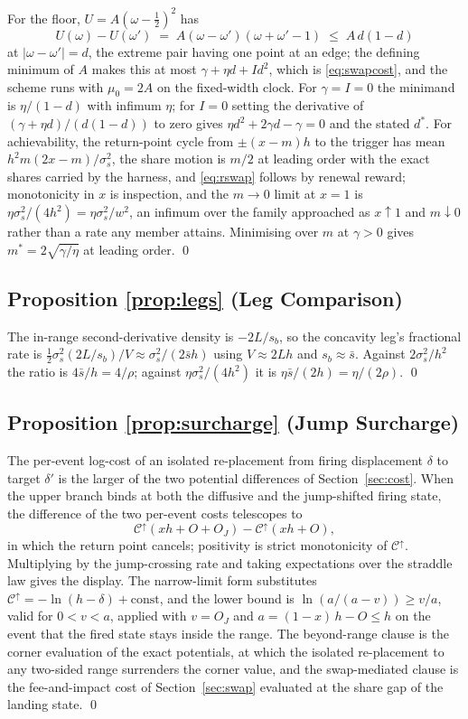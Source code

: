 \documentclass[11pt,a4paper]{article}
\theoremstyle{definition}
\theoremstyle{plain}
\theoremstyle{remark}
\begin{document}
For the floor, $U = A(\omega - \tfrac12)^2$ has
\[
U(\omega) - U(\omega') \;=\; A(\omega - \omega')(\omega + \omega' - 1)
\;\le\; A\,d(1 - d)
\]
at $|\omega - \omega'| = d$, the extreme pair having one point at an edge; the defining minimum of $A$ makes this at most $\gamma + \eta d + I d^2$, which is \eqref{eq:swapcost}, and the
scheme runs with $\mu_0 = 2A$ on the fixed-width clock. For $\gamma= I = 0$ the minimand is $\eta/(1 - d)$ with infimum
$\eta$; for $I = 0$ setting the derivative of $(\gamma +\eta d)/(d(1-d))$ to zero gives $\eta d^2 + 2\gamma d - \gamma = 0$
and the stated $d^*$. For achievability, the return-point cycle from
$\pm(x - m)h$ to the trigger has mean $h^2 m (2x - m)/\sigma_s^2$, the share motion is $m/2$ at leading order with the exact shares
carried by the harness, and \eqref{eq:rswap} follows by renewal reward; monotonicity in $x$ is inspection, and the $m \to 0$ limit at $x = 1$ is $\eta \sigma_s^2/(4h^2) = \eta\sigma_s^2/w^2$, an
infimum over the family approached as $x \uparrow 1$ and $m\downarrow 0$ rather than a rate any member attains. Minimising over $m$ at $\gamma > 0$ gives $m^* = 2\sqrt{\gamma/\eta}$ at leading 
order. \qed

\subsection{Proposition \ref{prop:legs} (Leg Comparison)}

The in-range second-derivative density is $-2L/s_b$, so the concavity leg's fractional rate is $\tfrac12 \sigma_s^2 (2L/s_b)/V
\approx \sigma_s^2/(2\bar s h)$ using $V \approx 2Lh$ and $s_b
\approx \bar s$. Against $2\sigma_s^2/h^2$ the ratio is $4\bar s/h
= 4/\rho$; against $\eta\sigma_s^2/(4h^2)$ it is $\eta \bar s/(2h)
= \eta/(2\rho)$. \qed

\subsection{Proposition \ref{prop:surcharge} (Jump Surcharge)}

The per-event log-cost of an isolated re-placement from firing displacement $\delta$ to target $\delta'$ is the larger of the two potential differences of Section~\ref{sec:cost}. When the upper
branch binds at both the diffusive and the jump-shifted firing state, the difference of the two per-event costs telescopes to
\[
\mathcal{C}^{\uparrow}(xh + O + O_J) -
\mathcal{C}^{\uparrow}(xh + O),
\]
in which the
return point cancels; positivity is strict monotonicity of $\mathcal{C}^{\uparrow}$. Multiplying by the jump-crossing rate and taking expectations over the straddle law gives the display.
The narrow-limit form substitutes $\mathcal{C}^{\uparrow} = -\ln(h - \delta) + \text{const}$, and the lower bound is $\ln(a/(a - v)) \ge v/a$, valid for $0 < v < a$, applied with $v = O_J$ and $a
= (1-x)\,h - O \le h$ on the event that the fired state stays inside the range. The beyond-range clause is the corner evaluation of the exact potentials, at which the isolated re-placement to 
any two-sided range surrenders the corner value, and the swap-mediated clause is the fee-and-impact cost of Section~\ref{sec:swap} evaluated at the share gap of the landing state. \qed
\end{document}
